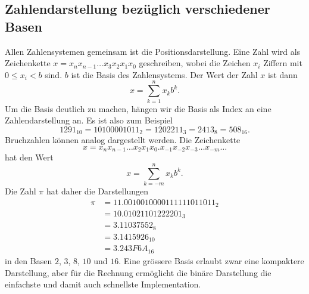 \subsection{Zahlendarstellung bezüglich verschiedener Basen
\label{buch:subsection:basen}}
Allen Zahlensystemen gemeinsam ist die Positionsdarstellung.
Eine Zahl wird als Zeichenkette $x=x_nx_{n-1}\dots x_3x_2x_1x_0$
geschreiben,
wobei die Zeichen $x_i$ Ziffern mit $0 \le x_i < b$ sind.
$b$ ist die Basis des Zahlensystems.
%
Der Wert der Zahl $x$ ist dann 
\[
x
=
\sum_{k=1}^n x_kb^k.
\]
Um die Basis deutlich zu machen, 
hängen wir die Basis als Index an eine Zahlendarstellung an.
Es ist also zum Beispiel
\[
1291_{10}
=
10100001011_2
=
1202211_3
=
2413_8
=
508_{16}.
\]
Bruchzahlen können analog dargestellt werden.
%
Die Zeichenkette
\[
x = x_{n}x_{n-1}\dots x_2x_1x_0\texttt{.}x_{-1}x_{-2}x_{-3}\dots x_{-m}\dots
\]
hat den Wert
\[
x = \sum_{k=-m}^n x_kb^k.
\]
Die Zahl $\pi$ hat daher die Darstellungen
%
\begin{align*}
\pi
&=
11.0010010000111111011011_2
\\
&=
10.01021101222201_3
\\
&=
3.11037552_8
\\
&=
3.1415926_{10}
\\
&=
3.243F6A_{16}
\end{align*}
in den Basen $2$, $3$, $8$, $10$ und $16$.
Eine grössere Basis erlaubt zwar eine kompaktere Darstellung, aber
für die Rechnung ermöglicht die binäre Darstellung die einfachste
und damit auch schnellste Implementation.

